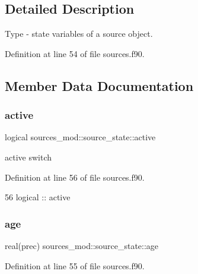 \subsection{Detailed Description}
Type -\/ state variables of a source object. 

Definition at line 54 of file sources.\+f90.



\subsection{Member Data Documentation}
\mbox{\label{structsources__mod_1_1source__state_ab31d51c870b76a1e4ca9b03f5847a7c2}} 
\subsubsection{\texorpdfstring{active}{active}}
{\footnotesize\ttfamily logical sources\+\_\+mod\+::source\+\_\+state\+::active\hspace{0.3cm}{\ttfamily [private]}}



active switch 



Definition at line 56 of file sources.\+f90.


\begin{DoxyCode}
56         \textcolor{keywordtype}{logical} :: active
\end{DoxyCode}
\mbox{\label{structsources__mod_1_1source__state_a60a0c06c969401978a8cd13b4682fe1c}} 
\subsubsection{\texorpdfstring{age}{age}}
{\footnotesize\ttfamily real(prec) sources\+\_\+mod\+::source\+\_\+state\+::age\hspace{0.3cm}{\ttfamily [private]}}



Definition at line 55 of file sources.\+f90.



